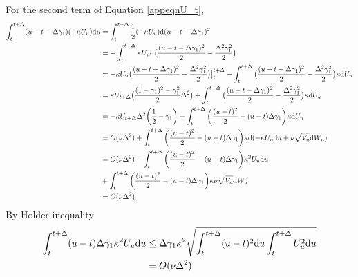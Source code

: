 \documentclass{ws-ijfe}
\begin{document}
For the second term of Equation \ref{appeqnU_t},
\begin{align*}
   \int_{t}^{t+\Delta}(u-t-\Delta\gamma_1)(-\kappa U_u)\mathrm{d} u & = \int_{t}^{t+\Delta}\frac{1}{2}(-\kappa U_u)\mathrm{d} (u-t-\Delta\gamma_1)^2\\
   & = -\int_{t}^{t+\Delta}\kappa U_u\mathrm{d} \big(\frac{(u-t-\Delta\gamma_1)^2}{2}-\frac{\Delta^2\gamma_1^2}{2}\big)\\
   & = -\kappa U_{u}\big(\frac{(u-t-\Delta\gamma_1)^2}{2}-\frac{\Delta^2\gamma_1^2}{2}\big)\big|_t^{t+\Delta}+\int_{t}^{t+\Delta}\big(\frac{(u-t-\Delta\gamma_1)^2}{2}-\frac{\Delta^2\gamma_1^2}{2}\big)\kappa \mathrm{d} U_u\\
   & = \kappa U_{t+\Delta}\big(\frac{(1-\gamma_1)^2-\gamma_1^2}{2}\Delta^2\big)+ \int_{t}^{t+\Delta}\big(\frac{(u-t-\Delta\gamma_1)^2}{2}-\frac{\Delta^2\gamma_1^2}{2}\big)\kappa \mathrm{d} U_u\\
   & = -\kappa U_{t+\Delta}\Delta^2\bigg(\frac{1}{2}-\gamma_1\bigg)+\int_{t}^{t+\Delta}\bigg(\frac{(u-t)^2}{2}-(u-t)\Delta\gamma_1\bigg)\kappa\mathrm{d} U_u\\
   & = O(\nu\Delta^2)+\int_{t}^{t+\Delta}\bigg(\frac{(u-t)^2}{2}-(u-t)\Delta\gamma_1\bigg)\kappa \mathrm{d} (-\kappa U_u\mathrm{d} u + \nu\sqrt{V_u}\mathrm{d} W_u)\\
   & = O(\nu\Delta^2)-\int_{t}^{t+\Delta}\bigg(\frac{(u-t)^2}{2}-(u-t)\Delta\gamma_1\bigg)\kappa^2U_u\mathrm{d} u\\
   & + \int_{t}^{t+\Delta}\bigg(\frac{(u-t)^2}{2}-(u-t)\Delta\gamma_1\bigg)\kappa\nu\sqrt{V_u}\mathrm{d} W_u\\
   & = O(\nu\Delta^2)
\end{align*}
By Holder inequality
\begin{align*}
   \int_{t}^{t+\Delta}(u-t)\Delta\gamma_1\kappa^2U_u\mathrm{d} u &\leq \Delta\gamma_1\kappa^2\sqrt{\int_{t}^{t+\Delta}(u-t)^2\mathrm{d} u\int_{t}^{t+\Delta}U_u^2\mathrm{d} u}\\
   & = O(\nu\Delta^2)
\end{align*}
\end{document}
